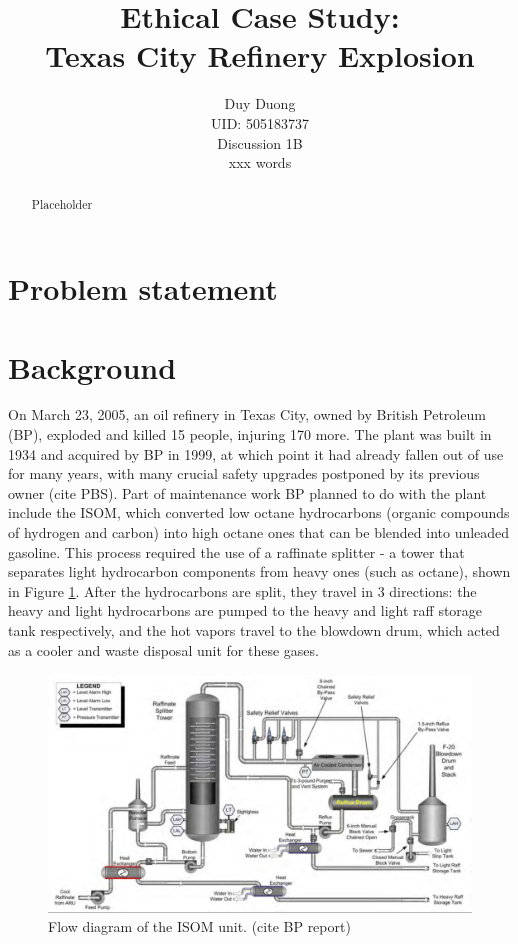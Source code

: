 \documentclass[12pt]{article}
\begin{document}
		\title{Ethical Case Study: \\Texas City Refinery Explosion}

	\author{Duy Duong\\UID: 505183737\\Discussion 1B\\xxx words}
	\maketitle
	
	\begin{abstract}
Placeholder
	\end{abstract}
	\setlength{\parskip}{1em}
	\section*{Problem statement}
	
	\section*{Background}
	
	On March 23, 2005, an oil refinery in Texas City, owned by British Petroleum (BP), exploded and killed 15 people, injuring 170 more. The plant was built in 1934 and acquired by BP in 1999, at which point it had already fallen out of use for many years, with many crucial safety upgrades postponed by its previous owner (cite PBS). Part of maintenance work BP planned to do with the plant include the ISOM, which converted low octane hydrocarbons (organic compounds of hydrogen and carbon) into high octane ones that can be blended into unleaded gasoline. This process required the use of a raffinate splitter - a tower that separates light hydrocarbon components from heavy ones (such as octane), shown in Figure \ref{fig:ISOMunit}. After the hydrocarbons are split, they travel in 3 directions: the heavy and light hydrocarbons are pumped to the heavy and light raff storage tank respectively, and the hot vapors travel to the blowdown drum, which acted as a cooler and waste disposal unit for these gases.
	
	\begin{figure}[H]

		\includegraphics[width=\textwidth]{BP_Texas_City_ISOM_unit.png}
		\caption{Flow diagram of the ISOM unit. (cite BP report)}
		\label{fig:ISOMunit}
	\end{figure}
	
\end{document}
